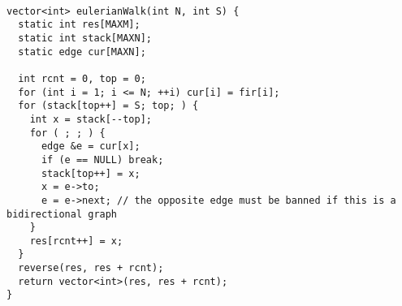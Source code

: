 \begin{lstlisting}

vector<int> eulerianWalk(int N, int S) {
  static int res[MAXM];
  static int stack[MAXN];
  static edge cur[MAXN];

  int rcnt = 0, top = 0;
  for (int i = 1; i <= N; ++i) cur[i] = fir[i];
  for (stack[top++] = S; top; ) {
    int x = stack[--top];
    for ( ; ; ) {
      edge &e = cur[x];
      if (e == NULL) break;
      stack[top++] = x;
      x = e->to;
      e = e->next; // the opposite edge must be banned if this is a bidirectional graph
    }
    res[rcnt++] = x;
  }
  reverse(res, res + rcnt);
  return vector<int>(res, res + rcnt);
}

\end{lstlisting}